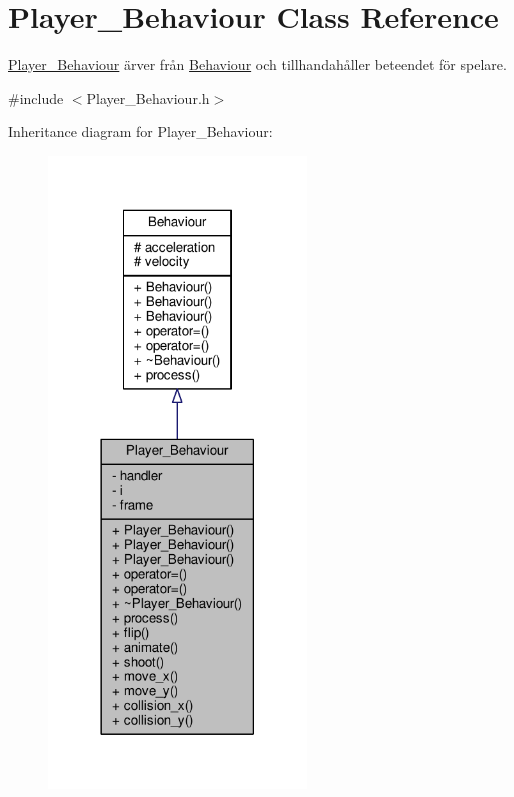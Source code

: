 \hypertarget{classPlayer__Behaviour}{\section{Player\+\_\+\+Behaviour Class Reference}
\label{classPlayer__Behaviour}
}


\hyperlink{classPlayer__Behaviour}{Player\+\_\+\+Behaviour} ärver från \hyperlink{classBehaviour}{Behaviour} och tillhandahåller beteendet för spelare.  




{\ttfamily \#include $<$Player\+\_\+\+Behaviour.\+h$>$}



Inheritance diagram for Player\+\_\+\+Behaviour\+:\nopagebreak
\begin{figure}[H]
\begin{center}
\leavevmode
\includegraphics[width=194pt]{classPlayer__Behaviour__inherit__graph}
\end{center}
\end{figure}


